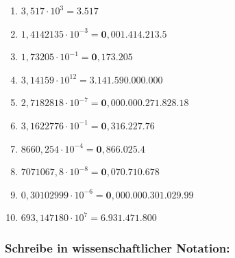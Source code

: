 \documentclass[a4paper,10pt]{article} %
\begin{document}
\begin{enumerate}[label=\alph*)]

  \item \(3,517 \cdot 10^3 =
    \mathbf{3.517}\) %

  \item \(1,4142135 \cdot 10^{-3} =
    \mathbf{0,001.414.213.5}\) %

  \item \(1,73205 \cdot 10^{-1} =
    \mathbf{0,173.205}\) %

  \item \(3,14159 \cdot 10^{12} =
    \mathbf{3.141.590.000.000}\) %

  \item \(2,7182818 \cdot 10^{-7} =
    \mathbf{0,000.000.271.828.18}\) %

  \item \(3,1622776 \cdot 10^{-1} =
    \mathbf{0,316.227.76}\) %

  \item \(8660,254 \cdot 10^{-4} =
    \mathbf{0,866.025.4}\) %

  \item \(7071067,8 \cdot 10^{-8} =
    \mathbf{0,070.710.678}\) %

  \item \(0,30102999 \cdot 10^{-6} =
    \mathbf{0,000.000.301.029.99}\) %

  \item \(693,147180 \cdot 10^7 =
    \mathbf{6.931.471.800}\) %

\end{enumerate}

\subsubsection{Schreibe in wissenschaftlicher Notation:} %
\end{document}
